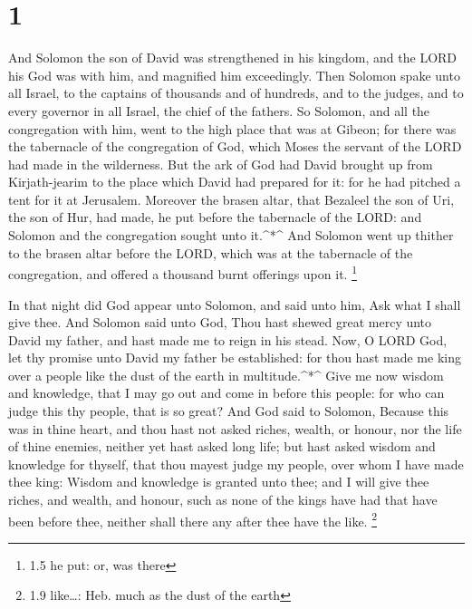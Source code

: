 \hypertarget{section}{%
\section{1}\label{section}}

 And Solomon the son of David was strengthened in his
kingdom, and the LORD his God was with him, and magnified him
exceedingly.  Then Solomon spake unto all Israel, to the
captains of thousands and of hundreds, and to the judges, and to every
governor in all Israel, the chief of the fathers.  So
Solomon, and all the congregation with him, went to the high place that
was at Gibeon; for there was the tabernacle of the congregation of God,
which Moses the servant of the LORD had made in the wilderness.
 But the ark of God had David brought up from Kirjath-jearim
to the place which David had prepared for it: for he had pitched a tent
for it at Jerusalem.  Moreover the brasen altar, that
Bezaleel the son of Uri, the son of Hur, had made, he put before the
tabernacle of the LORD: and Solomon and the congregation sought unto
it.\^{}*\^{}  And Solomon went up thither to the brasen
altar before the LORD, which was at the tabernacle of the congregation,
and offered a thousand burnt offerings upon it. \footnote{1.5 he put:
  or, was there}

 In that night did God appear unto Solomon, and said unto
him, Ask what I shall give thee.  And Solomon said unto God,
Thou hast shewed great mercy unto David my father, and hast made me to
reign in his stead.  Now, O LORD God, let thy promise unto
David my father be established: for thou hast made me king over a people
like the dust of the earth in multitude.\^{}*\^{}  Give me
now wisdom and knowledge, that I may go out and come in before this
people: for who can judge this thy people, that is so great?
 And God said to Solomon, Because this was in thine heart,
and thou hast not asked riches, wealth, or honour, nor the life of thine
enemies, neither yet hast asked long life; but hast asked wisdom and
knowledge for thyself, that thou mayest judge my people, over whom I
have made thee king:  Wisdom and knowledge is granted unto
thee; and I will give thee riches, and wealth, and honour, such as none
of the kings have had that have been before thee, neither shall there
any after thee have the like. \footnote{1.9 like\ldots: Heb. much as the
  dust of the earth}

